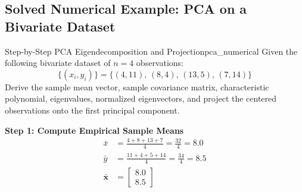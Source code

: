 \subsection{Solved Numerical Example: PCA on a Bivariate Dataset}

\begin{example}{Step-by-Step PCA Eigendecomposition and Projection}{pca_numerical}
Given the following bivariate dataset of $n = 4$ observations:
\begin{equation}
    \{(x_i, y_i)\} = \{(4, 11),\, (8, 4),\, (13, 5),\, (7, 14)\}
\end{equation}
Derive the sample mean vector, sample covariance matrix, characteristic polynomial, eigenvalues, normalized eigenvectors, and project the centered observations onto the first principal component.

\tcblower
\textbf{Step 1: Compute Empirical Sample Means}
\begin{align*}
    \bar{x} &= \frac{4 + 8 + 13 + 7}{4} = \frac{32}{4} = 8.0 \\[4pt]
    \bar{y} &= \frac{11 + 4 + 5 + 14}{4} = \frac{34}{4} = 8.5 \\[4pt]
    \bar{\mathbf{x}} &= \begin{bmatrix} 8.0 \\ 8.5 \end{bmatrix}
\end{align*}


\end{example}
